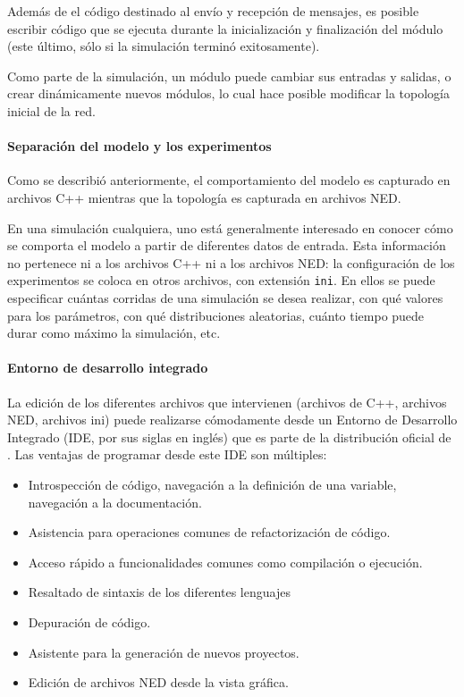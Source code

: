 \documentclass[]{article}
\begin{document}
Además de el código destinado al envío y recepción de mensajes, es posible
escribir código que se ejecuta durante la inicialización y finalización del
módulo (este último, sólo si la simulación terminó exitosamente).

Como parte de la simulación, un módulo puede cambiar sus entradas y salidas, o
crear dinámicamente nuevos módulos, lo cual hace posible modificar la topología
inicial de la red.

\paragraph{Separación del modelo y los experimentos}

Como se describió anteriormente, el comportamiento del modelo es capturado en
archivos C++ mientras que la topología es capturada en archivos NED.

En una simulación cualquiera, uno está generalmente interesado en conocer cómo
se comporta el modelo a partir de diferentes datos de entrada. Esta información
no pertenece ni a los archivos C++ ni a los archivos NED: la configuración de
los experimentos se coloca en otros archivos, con extensión \verb!ini!. En
ellos se puede especificar cuántas corridas de una simulación se desea
realizar, con qué valores para los parámetros, con qué distribuciones
aleatorias, cuánto tiempo puede durar como máximo la simulación, etc.

\paragraph{Entorno de desarrollo integrado}

La edición de los diferentes archivos que intervienen (archivos de C++,
archivos NED, archivos ini) puede realizarse cómodamente desde un Entorno de
Desarrollo Integrado (IDE, por sus siglas en inglés) que es parte de la
distribución oficial de \omnetpp{}. Las ventajas de programar desde este IDE son
múltiples:

\begin{itemize}
    \item Introspección de código, navegación a la definición de una variable,
navegación a la documentación.

    \item Asistencia para operaciones comunes de refactorización de código.

    \item Acceso rápido a funcionalidades comunes como compilación o ejecución.

    \item Resaltado de sintaxis de los diferentes lenguajes

    \item Depuración de código.

    \item Asistente para la generación de nuevos proyectos.

    \item Edición de archivos NED desde la vista gráfica.
\end{itemize}
\end{document}
